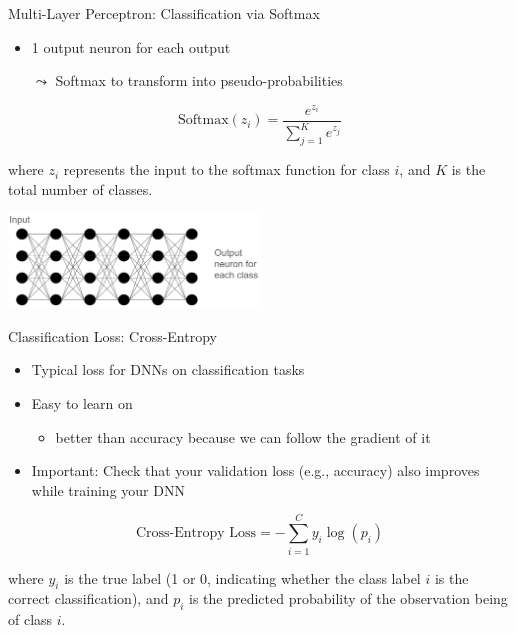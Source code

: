\documentclass[aspectratio=169]{../latex_main/tntbeamer}  %
\begin{document}
  	\begin{frame}{Multi-Layer Perceptron: Classification via Softmax}

        \begin{itemize}
            \item 1 output neuron for each output
            \item[$\leadsto$] Softmax to transform into pseudo-probabilities
        \end{itemize}

        \[
        \text{Softmax}(z_i) = \frac{e^{z_i}}{\sum_{j=1}^{K} e^{z_j}}
        \]
        
        where \( z_i \) represents the input to the softmax function for class \( i \), and \( K \) is the total number of classes.

        \centering
        \includegraphics[width=0.5\textwidth]{figures/mlp2.png}
                
	\end{frame}

  	\begin{frame}{Classification Loss: Cross-Entropy}

        \begin{itemize}
            \item Typical loss for DNNs on classification tasks
            \item Easy to learn on 
            \begin{itemize}
                \item better than accuracy because we can follow the gradient of it 
            \end{itemize}
            \item Important: Check that your validation loss (e.g., accuracy) also improves while training your DNN
        \end{itemize}

        \[
        \text{Cross-Entropy Loss} = -\sum_{i=1}^{C} y_i \log(p_i)
        \]
        
        where \( y_i \) is the true label (1 or 0, indicating whether the class label \( i \) is the correct classification), and \( p_i \) is the predicted probability of the observation being of class \( i \).
                
	\end{frame}

 	
\end{document}
